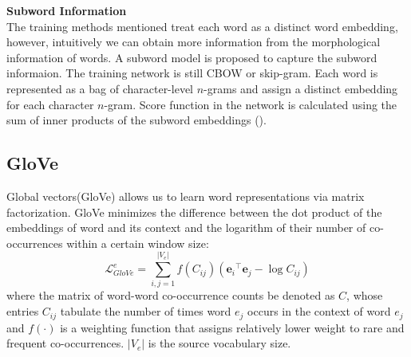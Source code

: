 \textbf{Subword Information}\\
The training methods mentioned treat each word as a distinct word embedding, however, intuitively we can obtain more information from the morphological information of words. A subword model is proposed to capture the subword informaion. The training network is still CBOW or skip-gram. Each word is represented as a bag of character-level $n$-grams and assign a distinct embedding for each character $n$-gram. Score function in the network is calculated using the sum of inner products of the subword embeddings (\cite{DBLP:journals/corr/BojanowskiGJM16}). \\

\subsection{GloVe}
Global vectors(GloVe) allows us to learn word representations via matrix factorization. GloVe minimizes the difference between the dot product of the embeddings of word and its context and the logarithm of their number of co-occurrences within a certain window size:
\[ \mathcal{L}_{GloVe}^e = \sum_{i,j=1}^{\lvert V_e \rvert} f(C_{ij})({\bm{e}_i}^{\top} \bm{e}_j - \log{C_{ij}} ) \]
where the matrix of word-word co-occurrence counts be denoted as $C$, whose entries $C_{ij}$ tabulate the number of times word $e_j$ occurs in the context of word $e_j$ and $f(\cdot)$ is a weighting function that assigns relatively lower weight to rare and frequent co-occurrences. ${\lvert V_e \rvert}$ is the source vocabulary size.
%
